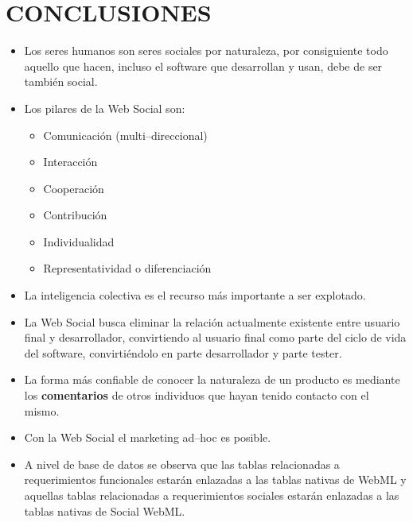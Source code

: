 \documentclass[oneside,12pt,a4paper]{memoir}%
\begin{document}
			

		
				
\chapter{CONCLUSIONES} %
\label{chap:Conclusions}

\begin{itemize}
  \item Los seres humanos son seres sociales por naturaleza, por consiguiente
  todo aquello que hacen, incluso el software que desarrollan y usan, debe de
  ser tambi\'en social.

  \item Los pilares de la Web Social son:
  \begin{itemize}
  	\item Comunicaci\'on (multi--direccional)
  	\item Interacci\'on
	\item Cooperaci\'on
  	\item Contribuci\'on
  	\item Individualidad
  	\item Representatividad o diferenciaci\'on
  \end{itemize}  
  \item La inteligencia colectiva es el recurso m\'as importante a ser
  explotado.
  \item La Web Social busca eliminar la relaci\'on actualmente existente entre
  usuario final y desarrollador, convirtiendo al usuario final como parte del
  ciclo de vida del software, convirti\'endolo en parte desarrollador y parte
  tester.
  \item La forma m\'as confiable de conocer la naturaleza de un producto es
  mediante los \textbf{comentarios} de otros individuos que hayan tenido
  contacto con el mismo.
  \item Con la Web Social el marketing ad--hoc es posible.
  \item A nivel de base de datos se observa que las tablas relacionadas a
  requerimientos funcionales estar\'an enlazadas a las tablas nativas de
  \ac{WebML} y aquellas tablas relacionadas a requerimientos sociales estar\'an
  enlazadas a las tablas nativas de Social WebML.
\end{itemize}




\renewcommand{\chapternamenum}{\scshape---~Anexo~}
\appendix
\clearpage
\end{document}
